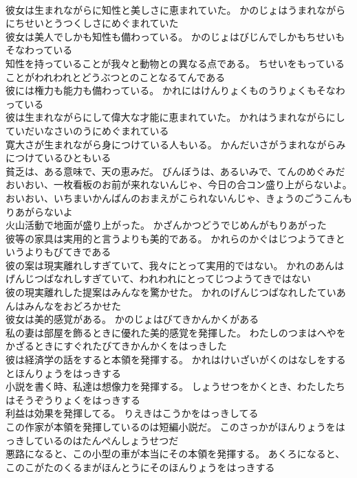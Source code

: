 \documentclass[8pt]{extreport}
\begin{document}
\begin{CJK}{UTF8}{min}
\\	彼女は生まれながらに知性と美しさに恵まれていた。	かのじょはうまれながらにちせいとうつくしさにめぐまれていた 
\\	彼女は美人でしかも知性も備わっている。	かのじょはびじんでしかもちせいもそなわっている 
\\	知性を持っていることが我々と動物との異なる点である。	ちせいをもっていることがわれわれとどうぶつとのことなるてんである 
\\	彼には権力も能力も備わっている。	かれにはけんりょくものうりょくもそなわっている 
\\	彼は生まれながらにして偉大な才能に恵まれていた。	かれはうまれながらにしていだいなさいのうにめぐまれている 
\\	寛大さが生まれながら身につけている人もいる。	かんだいさがうまれながらみにつけているひともいる 
\\	貧乏は、ある意味で、天の恵みだ。	びんぼうは、あるいみで、てんのめぐみだ 
\\	おいおい、一枚看板のお前が来れないんじゃ、今日の合コン盛り上がらないよ。	おいおい、いちまいかんばんのおまえがこられないんじゃ、きょうのごうこんもりあがらないよ 
\\	火山活動で地面が盛り上がった。	かざんかつどうでじめんがもりあがった 
\\	彼等の家具は実用的と言うよりも美的である。	かれらのかぐはじつようてきというよりもびてきである 
\\	彼の案は現実離れしすぎていて、我々にとって実用的ではない。	かれのあんはげんじつばなれしすぎていて、われわれにとってじつようてきではない 
\\	彼の現実離れした提案はみんなを驚かせた。	かれのげんじつばなれしたていあんはみんなをおどろかせた 
\\	彼女は美的感覚がある。	かのじょはびてきかんかくがある 
\\	私の妻は部屋を飾るときに優れた美的感覚を発揮した。	わたしのつまはへやをかざるときにすぐれたびてきかんかくをはっきした 
\\	彼は経済学の話をすると本領を発揮する。	かれはけいざいがくのはなしをするとほんりょうをはっきする 
\\	小説を書く時、私達は想像力を発揮する。	しょうせつをかくとき、わたしたちはそうぞうりょくをはっきする 
\\	利益は効果を発揮してる。	りえきはこうかをはっきしてる 
\\	この作家が本領を発揮しているのは短編小説だ。	このさっかがほんりょうをはっきしているのはたんぺんしょうせつだ 
\\	悪路になると、この小型の車が本当にその本領を発揮する。	あくろになると、このこがたのくるまがほんとうにそのほんりょうをはっきする 

\end{CJK}
\end{document}
